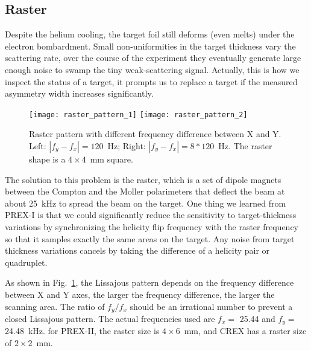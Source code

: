 \subsection{Raster}
Despite the helium cooling, the target foil still deforms (even melts)
under the electron bombardment. Small non-uniformities in the target 
thickness vary the scattering rate, over the course of the experiment they 
eventually generate large enough noise to swamp the tiny weak-scattering signal.
Actually, this is how we inspect the status of a target, it prompts us to
replace a target if the measured asymmetry width increases significantly.

\begin{figure}[!h]
    \centering
    \texttt{[image: raster\_pattern\_1]}
    \texttt{[image: raster\_pattern\_2]}
    \caption[Raster pattern]
    {Raster pattern with different frequency difference between X and Y.
    Left: $|f_y - f_x| = 120$~Hz; Right: $|f_y - f_x| = 8*120$~Hz. The raster
    shape is a $4\times 4$~mm square.} 
    \label{fig:raster_pattern}
\end{figure}

The solution to this problem is the raster, which is a set of dipole magnets %
between the Compton and the Moller polarimeters
that deflect the beam at about 25~kHz to spread the beam on the target.
One thing we learned from PREX-I is that we could significantly reduce the sensitivity 
to target-thickness variations by synchronizing the helicity flip frequency
with the raster frequency so that it samples exactly the same areas on the target.
Any noise from target thickness variations cancels by taking the difference of
a helicity pair or quadruplet. 

As shown in Fig.~\ref{fig:raster_pattern}, the Lissajous pattern depends
on the frequency difference between X and Y axes, the larger the frequency difference,
the larger the scanning area. The ratio of $f_y/f_x$ should be an irrational number
to prevent a closed Lissajous pattern. The actual frequencies used are $f_x =$ 25.44
and $f_y =$ 24.48~kHz. for PREX-II, the raster size is $4 \times 6$~mm, and CREX
has a raster size of $2 \times 2$~mm.


